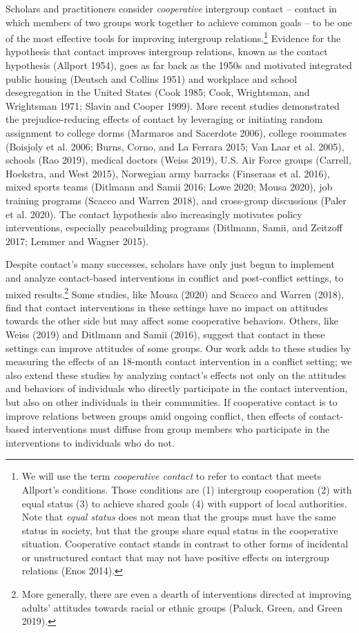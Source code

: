 \documentclass[11pt]{article}
\begin{document}
Scholars and practitioners consider \emph{cooperative} intergroup
contact -- contact in which members of two groups work together to
achieve common goals -- to be one of the most effective tools for
improving intergroup relations.\footnote{We will use the term
  \emph{cooperative contact} to refer to contact that meets Allport's
  conditions. Those conditions are (1) intergroup cooperation (2) with
  equal status (3) to achieve shared goals (4) with support of local
  authorities. Note that \emph{equal status} does not mean that the
  groups must have the same status in society, but that the groups share
  equal status in the cooperative situation. Cooperative contact stands
  in contrast to other forms of incidental or unstructured contact that
  may not have positive effects on intergroup relations (Enos 2014).}
Evidence for the hypothesis that contact improves intergroup relations,
known as the contact hypothesis (Allport 1954), goes as far back as the
1950s and motivated integrated public housing (Deutsch and Collins 1951)
and workplace and school desegregation in the United States (Cook 1985;
Cook, Wrightsman, and Wrightsman 1971; Slavin and Cooper 1999). More
recent studies demonstrated the prejudice-reducing effects of contact by
leveraging or initiating random assignment to college dorms (Marmaros
and Sacerdote 2006), college roommates (Boisjoly et al. 2006; Burns,
Corno, and La Ferrara 2015; Van Laar et al. 2005), schools (Rao 2019),
medical doctors (Weiss 2019), U.S. Air Force groups (Carrell, Hoekstra,
and West 2015), Norwegian army barracks (Finseraas et al. 2016), mixed
sports teams (Ditlmann and Samii 2016; Lowe 2020; Mousa 2020), job
training programs (Scacco and Warren 2018), and cross-group discussions
(Paler et al. 2020). The contact hypothesis also increasingly motivates
policy interventions, especially peacebuilding programs (Ditlmann,
Samii, and Zeitzoff 2017; Lemmer and Wagner 2015).

Despite contact's many successes, scholars have only just begun to
implement and analyze contact-based interventions in conflict and
post-conflict settings, to mixed results.\footnote{More generally, there
  are even a dearth of interventions directed at improving adults'
  attitudes towards racial or ethnic groups (Paluck, Green, and Green
  2019).} Some studies, like Mousa (2020) and Scacco and Warren (2018),
find that contact interventions in these settings have no impact on
attitudes towards the other side but may affect some cooperative
behaviors. Others, like Weiss (2019) and Ditlmann and Samii (2016),
suggest that contact in these settings can improve attitudes of some
groups. Our work adds to these studies by measuring the effects of an
18-month contact intervention in a conflict setting; we also extend
these studies by analyzing contact's effects not only on the attitudes
and behaviors of individuals who directly participate in the contact
intervention, but also on other individuals in their communities. If
cooperative contact is to improve relations between groups amid ongoing
conflict, then effects of contact-based interventions must diffuse from
group members who participate in the interventions to individuals who do
not.
\end{document}
